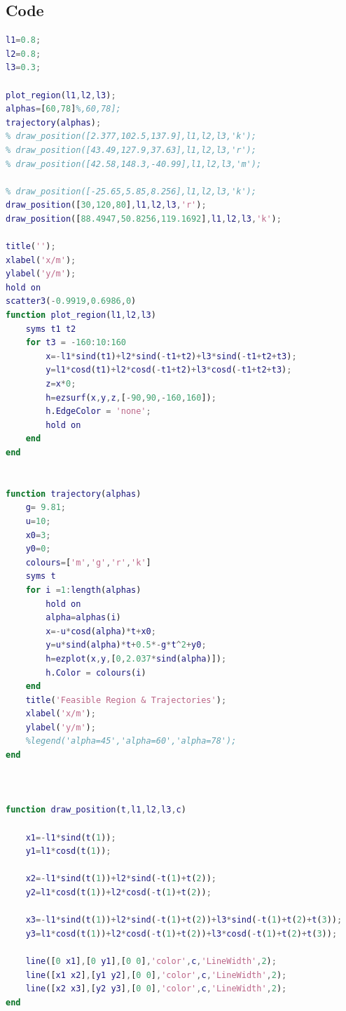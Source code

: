 \documentclass[twoside,twocolumn]{article}
\begin{document}
\subsection{Code}
\begin{lstlisting}[language=matlab]
l1=0.8;
l2=0.8;
l3=0.3;

plot_region(l1,l2,l3);
alphas=[60,78]%,60,78];
trajectory(alphas);
% draw_position([2.377,102.5,137.9],l1,l2,l3,'k');
% draw_position([43.49,127.9,37.63],l1,l2,l3,'r');
% draw_position([42.58,148.3,-40.99],l1,l2,l3,'m');

% draw_position([-25.65,5.85,8.256],l1,l2,l3,'k');
draw_position([30,120,80],l1,l2,l3,'r');
draw_position([88.4947,50.8256,119.1692],l1,l2,l3,'k');

title('');
xlabel('x/m');
ylabel('y/m');
hold on
scatter3(-0.9919,0.6986,0)
function plot_region(l1,l2,l3)
    syms t1 t2
    for t3 = -160:10:160
        x=-l1*sind(t1)+l2*sind(-t1+t2)+l3*sind(-t1+t2+t3);
        y=l1*cosd(t1)+l2*cosd(-t1+t2)+l3*cosd(-t1+t2+t3);
        z=x*0;
        h=ezsurf(x,y,z,[-90,90,-160,160]);
        h.EdgeColor = 'none';
        hold on
    end
end


function trajectory(alphas)
    g= 9.81;
    u=10;
    x0=3;
    y0=0;
    colours=['m','g','r','k']
    syms t
    for i =1:length(alphas)
        hold on
        alpha=alphas(i)
        x=-u*cosd(alpha)*t+x0;
        y=u*sind(alpha)*t+0.5*-g*t^2+y0;
        h=ezplot(x,y,[0,2.037*sind(alpha)]);
        h.Color = colours(i)
    end
    title('Feasible Region & Trajectories');
    xlabel('x/m');
    ylabel('y/m');
    %legend('alpha=45','alpha=60','alpha=78');
end



function draw_position(t,l1,l2,l3,c)
  
    x1=-l1*sind(t(1));
    y1=l1*cosd(t(1));
    
    x2=-l1*sind(t(1))+l2*sind(-t(1)+t(2));
    y2=l1*cosd(t(1))+l2*cosd(-t(1)+t(2));
    
    x3=-l1*sind(t(1))+l2*sind(-t(1)+t(2))+l3*sind(-t(1)+t(2)+t(3));
    y3=l1*cosd(t(1))+l2*cosd(-t(1)+t(2))+l3*cosd(-t(1)+t(2)+t(3));

    line([0 x1],[0 y1],[0 0],'color',c,'LineWidth',2);
    line([x1 x2],[y1 y2],[0 0],'color',c,'LineWidth',2);
    line([x2 x3],[y2 y3],[0 0],'color',c,'LineWidth',2);
end
\end{lstlisting}
\end{document}
